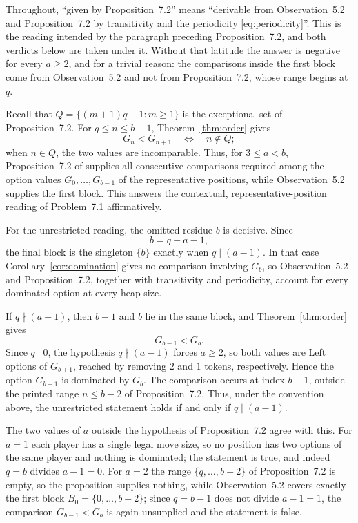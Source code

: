 \documentclass[11pt]{amsart}
\begin{document}
Throughout, ``given by Proposition~7.2'' means ``derivable from
Observation~5.2 and Proposition~7.2 by transitivity and the periodicity
\eqref{eq:periodicity}''. This is the reading intended by the paragraph
preceding Proposition~7.2, and both verdicts below are
taken under it.
Without that latitude the answer is negative for every $a\ge2$, and for
a trivial reason: the comparisons inside the first block come from
Observation~5.2 and not from Proposition~7.2, whose range begins at $q$.

Recall that $Q=\{(m+1)q-1:m\ge1\}$ is the exceptional set of
Proposition~7.2. For $q\le n\le b-1$, Theorem~\ref{thm:order} gives
\[
G_n<G_{n+1}\quad\Longleftrightarrow\quad n\notin Q;
\]
when $n\in Q$, the two values are incomparable. Thus, for $3\le a<b$,
Proposition~7.2 of \cite{DL} supplies all consecutive comparisons
required among the option values $G_0,\dots,G_{b-1}$ of the
representative positions, while Observation~5.2 supplies the first
block. This answers the
contextual, representative-position reading of Problem~7.1
affirmatively.

For the unrestricted reading, the omitted residue $b$ is decisive.
Since
\[
b=q+a-1,
\]
the final block is the singleton $\{b\}$ exactly when $q\mid(a-1)$.
In that case Corollary~\ref{cor:domination} gives no comparison involving
$G_b$, so Observation~5.2 and Proposition~7.2, together with
transitivity and periodicity, account for every dominated option at
every heap size.

If $q\nmid(a-1)$, then $b-1$ and $b$ lie in the same block, and
Theorem~\ref{thm:order} gives
\[
G_{b-1}<G_b.
\]
Since $q\mid0$, the hypothesis $q\nmid(a-1)$ forces $a\ge2$, so both
values are Left options of $G_{b+1}$, reached by removing $2$ and $1$
tokens, respectively. Hence the option $G_{b-1}$ is dominated by
$G_b$. The comparison occurs at index $b-1$, outside the printed range
$n\le b-2$ of Proposition~7.2. Thus, under the convention above, the
unrestricted statement holds if and only if $q\mid(a-1)$.

The two values of $a$ outside the hypothesis of Proposition~7.2 agree
with this. For $a=1$ each player has a single legal move size, so no
position has two options of the same player and nothing is dominated;
the statement is true, and indeed $q=b$ divides $a-1=0$. For $a=2$ the
range $\{q,\dots,b-2\}$ of Proposition~7.2 is empty, so the proposition
supplies nothing, while Observation~5.2 covers exactly the first block
$B_0=\{0,\dots,b-2\}$; since $q=b-1$ does not divide $a-1=1$, the
comparison $G_{b-1}<G_b$ is again unsupplied and the statement is
false.
\end{document}
